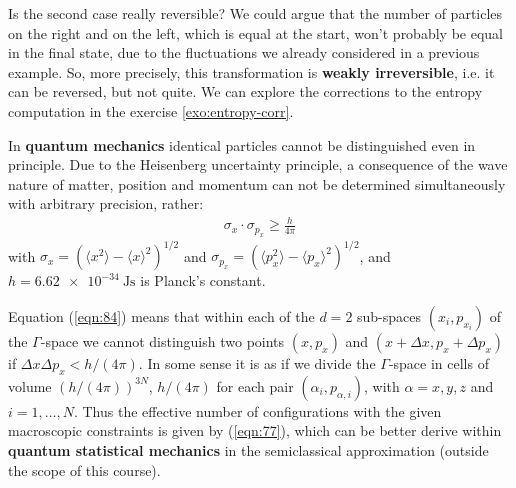\documentclass[../../main.tex]{subfiles}
\begin{document}
\begin{appr}
    Is the second case really reversible? We could argue that the number of particles on the right and on the left, which is equal at the start, won't probably be equal in the final state, due to the fluctuations we already considered in a previous example. So, more precisely, this transformation is \textbf{weakly irreversible}, i.e. it can  be reversed, but not quite. We can explore the corrections to the entropy computation in the exercise \ref{exo:entropy-corr}.
\end{appr}

\begin{exo}\label{exo:entropy-corr}
    
\end{exo}

In \textbf{quantum mechanics} identical particles cannot be distinguished even in principle. Due to the Heisenberg uncertainty principle, a consequence of the wave nature of matter, position and momentum can not be determined simultaneously with arbitrary precision, rather:
\begin{align}\label{eqn:84}
    \sigma_x \cdot \sigma_{p_x} \geq \frac{h}{4 \pi} 
\end{align} 
with $\sigma_x = (\langle x^2 \rangle - \langle x \rangle^2)^{1/2}$ and $\sigma_{p_x} = (\langle p_x^2 \rangle - \langle p_x \rangle^2)^{1/2}$, and $h = \SI{6.62e-34}{\J\s}$ is Planck's constant.


Equation (\ref{eqn:84}) means that within each of the $d=2$ sub-spaces $(x_i, p_{x_i})$ of the $\Gamma$-space we cannot distinguish two points $(x,p_x)$ and $(x+\Delta x, p_x + \Delta p_x)$ if $\Delta x \Delta p_x < h/(4\pi)$. In some sense it is as if we divide the $\Gamma$-space in cells of volume $(h/(4\pi))^{3N}$, $h/(4\pi)$ for each pair $(\alpha_i, p_{\alpha,i})$, with $\alpha=x,y,z$ and $i=1,\dots,N$. Thus the effective number of  configurations with the given macroscopic constraints is given by (\ref{eqn:77}), which can be better derive within \textbf{quantum statistical mechanics} in the semiclassical approximation (outside the scope of this course). 
\end{document}
